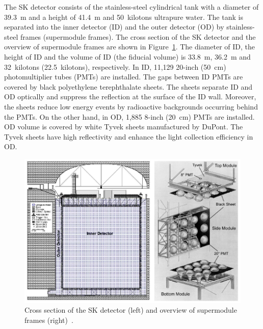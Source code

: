 \hs
The SK detector consists of the stainless-steel cylindrical tank with a diameter of 39.3~m and a height of 41.4~m and 50~kilotons ultrapure water.
The tank is separated into the inner detector (ID) and the outer detector (OD) by stainless-steel frames (supermodule frames).
The cross section of the SK detector and the overview of supermodule frames are shown in Figure~\ref{SK_SK_SM}.
The diameter of ID, the height of ID and the volume of ID (the fiducial volume) is 33.8~m, 36.2~m and 32~kilotons (22.5~kilotons), respectively.
In ID, 11,129 20-inch (50~cm) photomultiplier tubes (PMTs) are installed.
The gaps between ID PMTs are covered by black polyethylene terephthalate sheets.
The sheets separate ID and OD optically and suppress the reflection at the surface of the ID wall.
Moreover, the sheets reduce low energy events by radioactive backgrounds occurring behind the PMTs.
On the other hand, in OD, 1,885 8-inch (20~cm) PMTs are installed.
OD volume is covered by white Tyvek sheets manufactured by DuPont.
The Tyvek sheets have high reflectivity and enhance the light collection efficiency in OD.

\begin{figure}[tbp]
	\centering
	\includegraphics[width=14cm]{Figures/SK/SK_SM}
	\caption[Cross section of the SK detector and overview of supermodule frames]{
	Cross section of the SK detector (left) and overview of supermodule frames (right)~\cite{2003Fukuda}.
	}\label{SK_SK_SM}
\end{figure}





